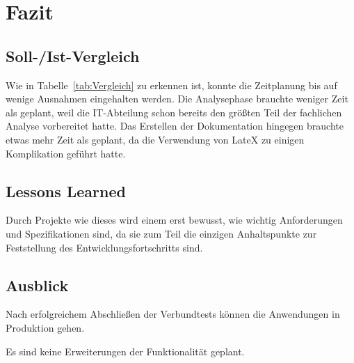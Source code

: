 \section{Fazit} 
\label{sec:Fazit}

\subsection{Soll-/Ist-Vergleich}
\label{sec:SollIstVergleich}

Wie in Tabelle~\ref{tab:Vergleich} zu erkennen ist, konnte die Zeitplanung bis auf wenige Ausnahmen eingehalten werden. Die Analysephase brauchte weniger Zeit als geplant, weil die IT-Abteilung schon bereits den größten Teil der fachlichen Analyse vorbereitet hatte. Das Erstellen der Dokumentation hingegen brauchte etwas mehr Zeit als geplant, da die Verwendung von LateX zu einigen Komplikation geführt hatte.


\subsection{Lessons Learned}
\label{sec:LessonsLearned}

Durch Projekte wie dieses wird einem erst bewusst, wie wichtig Anforderungen und Spezifikationen sind, da sie zum Teil die einzigen Anhaltspunkte zur Feststellung des Entwicklungsfortschritts sind.

\subsection{Ausblick}
\label{sec:Ausblick}

Nach erfolgreichem Abschließen der Verbundtests können die Anwendungen in Produktion gehen.

Es sind keine Erweiterungen der Funktionalität geplant.
